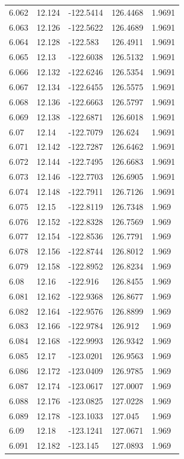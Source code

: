 \begin{tabular}{lllll}
6.062 & 12.124 & -122.5414 & 126.4468 & 1.9691 \\
6.063 & 12.126 & -122.5622 & 126.4689 & 1.9691 \\
6.064 & 12.128 & -122.583 & 126.4911 & 1.9691 \\
6.065 & 12.13 & -122.6038 & 126.5132 & 1.9691 \\
6.066 & 12.132 & -122.6246 & 126.5354 & 1.9691 \\
6.067 & 12.134 & -122.6455 & 126.5575 & 1.9691 \\
6.068 & 12.136 & -122.6663 & 126.5797 & 1.9691 \\
6.069 & 12.138 & -122.6871 & 126.6018 & 1.9691 \\
6.07 & 12.14 & -122.7079 & 126.624 & 1.9691 \\
6.071 & 12.142 & -122.7287 & 126.6462 & 1.9691 \\
6.072 & 12.144 & -122.7495 & 126.6683 & 1.9691 \\
6.073 & 12.146 & -122.7703 & 126.6905 & 1.9691 \\
6.074 & 12.148 & -122.7911 & 126.7126 & 1.9691 \\
6.075 & 12.15 & -122.8119 & 126.7348 & 1.969 \\
6.076 & 12.152 & -122.8328 & 126.7569 & 1.969 \\
6.077 & 12.154 & -122.8536 & 126.7791 & 1.969 \\
6.078 & 12.156 & -122.8744 & 126.8012 & 1.969 \\
6.079 & 12.158 & -122.8952 & 126.8234 & 1.969 \\
6.08 & 12.16 & -122.916 & 126.8455 & 1.969 \\
6.081 & 12.162 & -122.9368 & 126.8677 & 1.969 \\
6.082 & 12.164 & -122.9576 & 126.8899 & 1.969 \\
6.083 & 12.166 & -122.9784 & 126.912 & 1.969 \\
6.084 & 12.168 & -122.9993 & 126.9342 & 1.969 \\
6.085 & 12.17 & -123.0201 & 126.9563 & 1.969 \\
6.086 & 12.172 & -123.0409 & 126.9785 & 1.969 \\
6.087 & 12.174 & -123.0617 & 127.0007 & 1.969 \\
6.088 & 12.176 & -123.0825 & 127.0228 & 1.969 \\
6.089 & 12.178 & -123.1033 & 127.045 & 1.969 \\
6.09 & 12.18 & -123.1241 & 127.0671 & 1.969 \\
6.091 & 12.182 & -123.145 & 127.0893 & 1.969 \\

\end{tabular}
